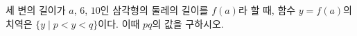 세 변의 길이가 $a$, $6$, $10$인 삼각형의 둘레의 길이를 $f(a)$라 할 때, 함수 $y=f(a)$의 치역은 $\{y \mid p<y<q\}$이다. 이때 $pq$의 값을 구하시오.
